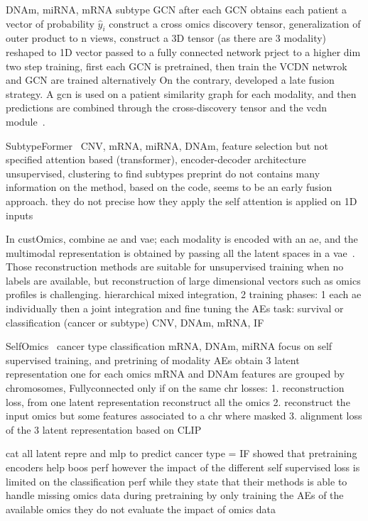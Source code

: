 \documentclass[../main.tex]{subfiles}
\begin{document}
		\cite{MOGONET} DNAm, miRNA, mRNA subtype GCN
		after each GCN obtains each patient a vector of probability \(\hat{y}_{i}\)
		construct a cross omics discovery tensor, generalization of outer product to n views, construct a 3D tensor (as there are 3 modality) reshaped to 1D vector passed to a fully connected network
		prject to a higher dim
		two step training, first each GCN is pretrained, then train the VCDN netwrok and GCN are trained alternatively
		On the contrary, \citeauthor{MOGONET} developed a late fusion strategy.
		A \gls{gcn} is used on a patient similarity graph for each modality, and then predictions are combined through the cross-discovery tensor and the \gls{vcdn} module~\cite{MOGONET}.



		SubtypeFormer~\cite{SubtypeFormer}
		CNV, mRNA, miRNA, DNAm, feature selection but not specified
		attention based (transformer), encoder-decoder architecture
		unsupervised, clustering to find subtypes
		preprint do not contains many information on the method, based on the code, seems to be an early fusion approach.
		they do not precise how they apply the self attention is applied on 1D inputs

		In custOmics, \citeauthor{customics} combine \gls{ae} and \gls{vae}; each modality is encoded with an \gls{ae}, and the multimodal representation is obtained by passing all the latent spaces in a \gls{vae}~\cite{customics}.
		Those reconstruction methods are suitable for unsupervised training when no labels are available, but reconstruction of large dimensional vectors such as omics profiles is challenging.
		hierarchical mixed integration, 2 training phases: 1 each ae individually then a joint integration and fine tuning the AEs
		task: survival or classification (cancer or subtype)
		CNV, DNAm, mRNA, IF

		SelfOmics~\cite{selfOmics}
		cancer type classification
		mRNA, DNAm, miRNA
		focus on self supervised training, and pretrining of modality AEs
		obtain 3 latent representation one for each omics
		mRNA and DNAm features are grouped by chromosomes, Fullyconnected only if on the same chr
		losses:
		1. reconstruction loss, from one latent representation reconstruct all the omics
		2. reconstruct the input omics but some features associated to a chr where masked
		3. alignment loss of the 3 latent representation based on CLIP

		cat all latent repre and mlp to predict cancer type = IF
		showed that pretraining encoders help boos perf however the impact of the different self supervised loss is limited on the classification perf
		while they state that their methods is able to handle missing omics data during pretraining by only training the AEs of the available omics they do not evaluate the impact of omics data
\end{document}
